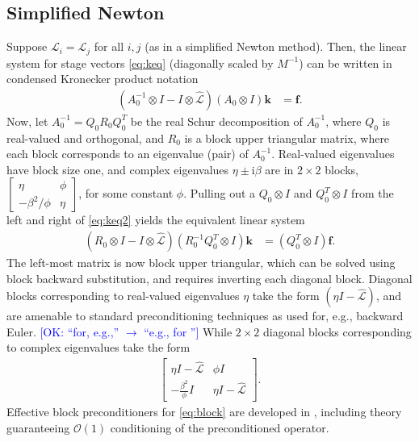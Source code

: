 \documentclass[review]{siamart}
\newcommand{\OK}[1]{\textcolor{blue}{[OK: #1]}}
\begin{document}
\subsection{Simplified Newton}\label{sec:nonlinear:simp}

Suppose $\mathcal{L}_i = \mathcal{L}_j$ for all $i,j$ (as in a simplified Newton method).
Then, the linear system for stage vectors \eqref{eq:keq} (diagonally scaled by $M^{-1}$)
can be written in condensed Kronecker product notation
%
\begin{align}\label{eq:keq2}
\left( A_0^{-1}\otimes I - I\otimes\widehat{\mathcal{L}}\right)
	(A_0\otimes I) \mathbf{k} & = \mathbf{f}.
\end{align}
%
Now, let $A_0^{-1} = Q_0R_0Q_0^T$ be the real Schur decomposition of $A_0^{-1}$, where
$Q_0$ is real-valued and orthogonal, and $R_0$ is a block
upper triangular matrix, where each block corresponds to an eigenvalue (pair) of
$A_0^{-1}$. Real-valued eigenvalues have block size one, and complex eigenvalues
$\eta\pm \mathrm{i} \beta$ are in $2\times 2$ blocks,
$\begin{bmatrix} \eta & \phi \\-\beta^2/\phi & \eta\end{bmatrix}$, for some
constant $\phi$.
Pulling out a $Q_0\otimes I$ and $Q_0^T\otimes I$ from the left and right of
\eqref{eq:keq2} yields the equivalent linear system
%
\begin{align}\label{eq:keq3}
\left( R_0\otimes I - I \otimes \widehat{\mathcal{L}}\right)
	(R_0^{-1}Q_0^T\otimes I) \mathbf{k} & = (Q_0^T\otimes I)\mathbf{f}.
\end{align}
%
The left-most matrix is now block upper triangular, which can be solved
using block backward substitution, and requires inverting each diagonal block.
Diagonal blocks corresponding to real-valued eigenvalues $\eta$ take the form
$(\eta I - \widehat{\mathcal{L}})$, and are amenable to standard preconditioning
techniques as used for, e.g., backward Euler.
%
\OK{``for, e.g.,'' $\to$ ``e.g., for ''}
%
While $2\times 2$ diagonal blocks
corresponding to complex eigenvalues take the form
%
\begin{align}\label{eq:block}
\begin{bmatrix} \eta I - \widehat{\mathcal{L}} & \phi I\\
-\frac{\beta^2}{\phi} I & \eta I - \widehat{\mathcal{L}}\end{bmatrix}.
\end{align}
%
Effective block preconditioners for \eqref{eq:block} are developed in
, including theory guaranteeing $\mathcal{O}(1)$
conditioning of the preconditioned operator.
\end{document}
